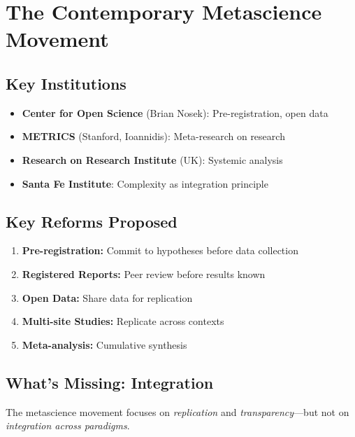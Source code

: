 
\section{The Contemporary Metascience Movement}
\label{sec:meta-movement}

\subsection{Key Institutions}

\begin{itemize}
\item \textbf{Center for Open Science} (Brian Nosek): Pre-registration, open data
\item \textbf{METRICS} (Stanford, Ioannidis): Meta-research on research
\item \textbf{Research on Research Institute} (UK): Systemic analysis
\item \textbf{Santa Fe Institute}: Complexity as integration principle
\end{itemize}

\subsection{Key Reforms Proposed}

\begin{enumerate}
\item \textbf{Pre-registration:} Commit to hypotheses before data collection
\item \textbf{Registered Reports:} Peer review before results known
\item \textbf{Open Data:} Share data for replication
\item \textbf{Multi-site Studies:} Replicate across contexts
\item \textbf{Meta-analysis:} Cumulative synthesis
\end{enumerate}

\subsection{What's Missing: Integration}

The metascience movement focuses on \textit{replication} and \textit{transparency}—but not on \textit{integration across paradigms}.

